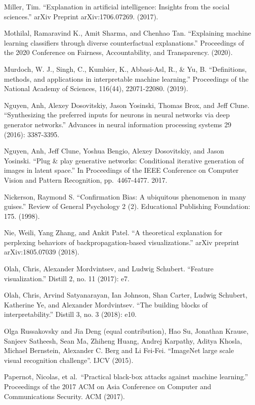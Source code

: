 \documentclass[
  10pt,
]{scrbook}
\begin{document}
Miller, Tim. ``Explanation in artificial intelligence: Insights from the social sciences.'' arXiv Preprint arXiv:1706.07269. (2017).

Mothilal, Ramaravind K., Amit Sharma, and Chenhao Tan. ``Explaining machine learning classifiers through diverse counterfactual explanations.'' Proceedings of the 2020 Conference on Fairness, Accountability, and Transparency. (2020).

Murdoch, W. J., Singh, C., Kumbier, K., Abbasi-Asl, R., \& Yu, B. ``Definitions, methods, and applications in interpretable machine learning.'' Proceedings of the National Academy of Sciences, 116(44), 22071-22080. (2019).

Nguyen, Anh, Alexey Dosovitskiy, Jason Yosinski, Thomas Brox, and Jeff Clune. ``Synthesizing the preferred inputs for neurons in neural networks via deep generator networks.'' Advances in neural information processing systems 29 (2016): 3387-3395.

Nguyen, Anh, Jeff Clune, Yoshua Bengio, Alexey Dosovitskiy, and Jason Yosinski. ``Plug \& play generative networks: Conditional iterative generation of images in latent space.'' In Proceedings of the IEEE Conference on Computer Vision and Pattern Recognition, pp.~4467-4477. 2017.

Nickerson, Raymond S. ``Confirmation Bias: A ubiquitous phenomenon in many guises.'' Review of General Psychology 2 (2). Educational Publishing Foundation: 175. (1998).

Nie, Weili, Yang Zhang, and Ankit Patel. ``A theoretical explanation for perplexing behaviors of backpropagation-based visualizations.'' arXiv preprint arXiv:1805.07039 (2018).

Olah, Chris, Alexander Mordvintsev, and Ludwig Schubert. ``Feature visualization.'' Distill 2, no. 11 (2017): e7.

Olah, Chris, Arvind Satyanarayan, Ian Johnson, Shan Carter, Ludwig Schubert, Katherine Ye, and Alexander Mordvintsev. ``The building blocks of interpretability.'' Distill 3, no. 3 (2018): e10.

Olga Russakovsky and Jia Deng (equal contribution), Hao Su, Jonathan Krause, Sanjeev Satheesh, Sean Ma, Zhiheng Huang, Andrej Karpathy, Aditya Khosla, Michael Bernstein, Alexander C. Berg and Li Fei-Fei. ``ImageNet large scale visual recognition challenge''. IJCV (2015).

Papernot, Nicolas, et al.~``Practical black-box attacks against machine learning.'' Proceedings of the 2017 ACM on Asia Conference on Computer and Communications Security. ACM (2017).
\end{document}
